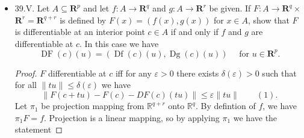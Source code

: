 \begin{itemize}
\begin{proof}
	Take $x \in N$ and write $x = (x_1, \ldots, x_p)$ and $c = (c_1, \ldots, c_p)$. Define $z_0, \ldots, z_p$ to be
	\begin{align*}
		&z_0 = x \\
		&z_1= (c_1, x_2, \ldots, x_p)\\
		&   \vdots\\
		&z_{p-1} = (c_1, c_2, \ldots, c_{p-1 }, x_p) \\
		&z_p =  c
	.\end{align*}
	Then it is easily seen that  $\|z_i - c\|\le \delta$ for $i = 0, 1, \ldots, p$. We write the difference $f(x) - f(c)$ as a telescoping sum:
	\[
		f(x) - f(c) = \sum_{j=1}^{p} f(z_{j-1 }) - f(z_j)
	.\] 
	Now since $N$ is convex, the line segment $\{t z_{j-1} + (1-t) z_j: t \in [0,1]\} $ is completely contained in $N$, and the function $f$ restricted to the line segment can be viewed as a differentiable function on $[0,1]$. Thus by mean-value theorem, there exists $\overline{z}_j$ in the line segment joining $z_{j-1}$ and $z_j$ such that
	\[
		f(z_{j-1}) - f(z_j) = (x_j - c_j)D_j f(\overline{z} _j)
	.\] 
	Therefore, we obtain
	\[
		f(x) - f(c) = \sum_{j=1}^{p} (x_j - c_j)D_j f(\overline{z} _j)
	.\] 
	By triangle inequality,
	\[
		\|f(x) - f(c)\|\le \sum_{j=1}^{p} \|(x_j - c_j)D_j f(\overline{z} _j)\|
	.\] 
	Thus by Schwarz Inequality,
	\[
		\|f(x) - f(c)\| \le \sum_{j=1}^{p} \|x_j - c_j\|\sum_{j=1}^{p} \|D_j f(\overline{z} _j)\| \le \sqrt{p} \|x - c\| pM 
	.\] 
	As $x\to c$, the right hand side vanishes. Thus $f(x) \to f(c)$ as $x \to  c$, so $f$ is continuous at $c$.
\end{proof}
\item 39.V. Let $A \subseteq \boldsymbol{R}^p$ and let $f: A \rightarrow \mathbf{R}^q$ and $g: A \rightarrow \mathbf{R}^r$ be given. If $F: A \rightarrow \boldsymbol{R}^q \times$ $\mathbf{R}^r=\mathbf{R}^{q+r}$ is defined by $F(x)=(f(x), g(x))$ for $x \in A$, show that $F$ is differentiable at an interior point $c \in A$ if and only if $f$ and $g$ are differentiable at $c$. In this case we have
\[
\operatorname{DF}(c)(u)=(\operatorname{Df}(c)(u), \operatorname{Dg}(c)(u)) \quad \text { for } u \in \boldsymbol{R}^p .
\]
\begin{proof}
	$F$ differentiable at $c$ iff for any $\varepsilon>0$ there exists $\delta(\varepsilon) > 0$ such that for all $\|t u\|\le \delta(\varepsilon)$ we have
	\[
		\| F(c + t u) - F(c) - DF(c)(tu) \| \le \varepsilon \|tu\| \qquad (1)
	.\]
	Let $\pi_1$ be projection mapping from $\mathbb{R}^{q + r}$ onto $\mathbb{R}^q$. By defintion of $f$, we have $\pi_1 F = f$. Projection is a linear mapping, so by applying $\pi_1$ we have the statement

\end{proof}
\end{itemize}
